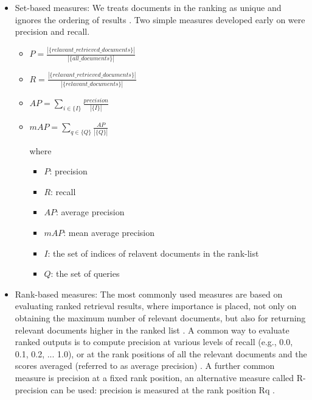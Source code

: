 \documentclass[10pt,conference,]{IEEEtran}
\begin{document}
\begin{itemize} \label{section:evaluation_ir_measurements}
\item{Set-based measures: We treats documents in the ranking as unique and ignores the ordering of results \cite{journals/ires/CloughS13}. Two simple measures developed early on were precision and recall. 
    \begin{itemize}
        \item{$P = \frac{\left|\{relavant\_retrieved\_documents\}\right|}{\left|\{all\_documents\}\right|}$}
        \item{$R = \frac{\left|\{relavant\_retrieved\_documents\}\right|}{\left|\{relavant\_documents\}\right|}$}
        \item{$AP = \sum\limits_{i \in \{I\}} \frac{precision}{\left|\{I\}\right|}$}
        \item{$mAP = \sum\limits_{q \in \{Q\}} \frac{AP}{\left|\{Q\}\right|} $}

        where 
        \begin{itemize}
        \item{$P$: precision}
        \item{$R$: recall}
        \item{$AP$: average precision}
        \item{$mAP$: mean average precision}
        \item{$I$: the set of indices of relavent documents in the rank-list}
        \item{$Q$: the set of queries}

        \end{itemize}
    \end{itemize}
}
\item{Rank-based measures: The most commonly used measures are based on evaluating ranked retrieval results, where importance is placed, not only on obtaining the maximum number of relevant documents, but also for returning relevant documents higher in the ranked list \cite{journals/ires/CloughS13}. A common way to evaluate ranked outputs is to compute precision at various levels of recall (e.g., 0.0, 0.1, 0.2, ... 1.0), or at the rank positions of all the relevant documents and the scores averaged (referred to as average precision) \cite{journals/ires/CloughS13}. A further common measure is precision at a fixed rank position, an alternative measure called R-precision can be used: precision is measured at the rank position Rq \cite{journals/ires/CloughS13}.
}
\end{itemize}
\end{document}
